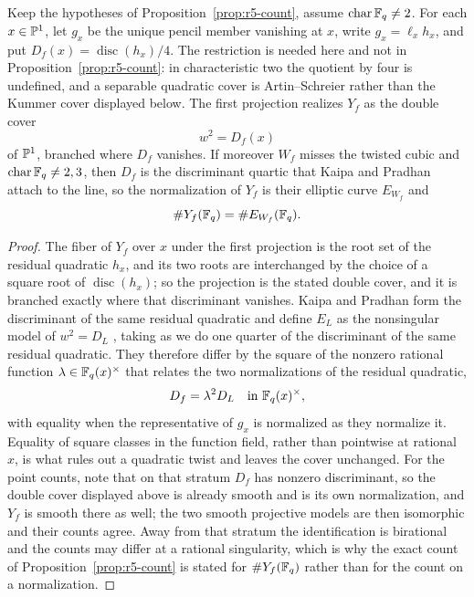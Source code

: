 \begin{proposition}
\label{prop:r5-fibre-is-elliptic}%
%
Keep the hypotheses of Proposition~\ref{prop:r5-count}, assume
$\operatorname{char}\mathbb F_q\neq2$.  For each \(x\in\mathbb P^1\), let \(g_x\) be the
unique pencil member vanishing at \(x\), write \(g_x=\ell_xh_x\), and put
$D_f(x)=\operatorname{disc}(h_x)/4$.  The restriction is needed here and
not in Proposition~\ref{prop:r5-count}: in characteristic two the
quotient by four is undefined, and a separable quadratic cover is
Artin--Schreier rather than the Kummer cover displayed below.  The first
projection realizes $Y_f$ as the double cover
\[
       w^2=D_f(x)
\]
of $\mathbb P^1$, branched where $D_f$ vanishes.  If moreover $W_f$ misses the
twisted cubic and $\operatorname{char}\mathbb F_q\neq2,3$, then $D_f$ is the
discriminant quartic that Kaipa and Pradhan attach to the line, so the
normalization of $Y_f$ is their elliptic curve $E_{W_f}$ and
\[
       \#Y_f(\mathbb F_q)=\#E_{W_f}(\mathbb F_q).
\]
\end{proposition}

\begin{proof}
The fiber of $Y_f$ over $x$ under the first projection is the root set
of the residual quadratic $h_x$, and its two roots are interchanged by
the choice of a square root of $\operatorname{disc}(h_x)$; so the
projection is the stated double cover, and it is branched exactly where
that discriminant vanishes.  Kaipa and Pradhan form the discriminant of
the same residual quadratic and define $E_L$ as the nonsingular model
of $w^2=D_L$ \cite[\S4--\S5]{KaipaPradhan2025}, taking as we do one quarter
of the discriminant of the same residual quadratic.  They therefore differ by
the square of the nonzero rational function $\lambda\in\mathbb F_q(x)^\times$
that relates the two normalizations of the residual quadratic,
\[
       D_f=\lambda^2D_L\quad\text{in }\mathbb F_q(x)^\times,
\]
with equality when the representative of $g_x$ is normalized as they
normalize it.  Equality of square classes in the function field, rather
than pointwise at rational $x$, is what rules out a quadratic twist and
leaves the cover unchanged.  For the point counts, note that on that
stratum $D_f$ has nonzero discriminant, so the double cover displayed
above is already smooth and is its own normalization, and $Y_f$ is
smooth there as well; the two smooth projective models are then
isomorphic and their counts agree.  Away from that stratum the
identification is birational and the counts may differ at a rational
singularity, which is why the exact count of
Proposition~\ref{prop:r5-count} is stated for $\#Y_f(\mathbb F_q)$ rather than
for the count on a normalization.
\end{proof}

